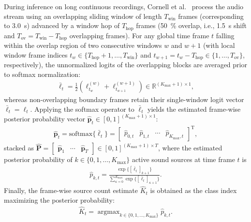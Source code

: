 \documentclass[lettersize,journal]{IEEEtran}
\DeclareMathOperator*{\argmax}{argmax}
\begin{document}
During inference on long continuous recordings, Cornell et al.~\cite{cornell2022overlapped} process the audio stream using an overlapping sliding window of length $T_{\mathrm{win}}$ frames (corresponding to \SI{3.0}{\second}) advanced by a window hop of $T_{\mathrm{hop}}$ frames (\SI{50}{\percent} overlap, i.e., \SI{1.5}{\second} shift and $T_{\mathrm{ov}} = T_{\mathrm{win}} - T_{\mathrm{hop}}$ overlapping frames). For any global time frame $t$ falling within the overlap region of two consecutive windows $w$ and $w+1$ (with local window frame indices $t_w \in \{T_{\mathrm{hop}}+1, \dots, T_{\mathrm{win}}\}$ and $t_{w+1} = t_w - T_{\mathrm{hop}} \in \{1, \dots, T_{\mathrm{ov}}\}$, respectively), the unnormalized logits of the overlapping blocks are averaged prior to softmax normalization:
\begin{align}
  \bar{\bm{\ell}}_t = \frac{1}{2}\left( \bm{\ell}_{t_w}^{(w)} + \bm{\ell}_{t_{w+1}}^{(w+1)} \right) \in \mathbb{R}^{(K_{\mathrm{max}} + 1) \times 1},
  \label{eq:sliding_window_logit_avg}
\end{align}
whereas non-overlapping boundary frames retain their single-window logit vector $\bar{\bm{\ell}}_t = \bm{\ell}_t$. Applying the softmax operator to $\bar{\bm{\ell}}_t$ yields the estimated frame-wise posterior probability vector $\widehat{\mathbf{p}}_t \in [0, 1]^{(K_{\mathrm{max}} + 1) \times 1}$:
\begin{align}
  \widehat{\mathbf{p}}_t = \mathrm{softmax}\{\bar{\bm{\ell}}_t\} = \begin{bmatrix} \widehat{p}_{0,t} & \widehat{p}_{1,t} & \cdots & \widehat{p}_{K_{\mathrm{max}},t} \end{bmatrix}^{\mathrm{T}},
  \label{eq:softmax_posteriors}
\end{align}
stacked as $\widehat{\mathbf{P}} = \begin{bmatrix} \widehat{\mathbf{p}}_1 & \cdots & \widehat{\mathbf{p}}_T \end{bmatrix} \in [0, 1]^{(K_{\mathrm{max}} + 1) \times T}$, where the estimated posterior probability of $k \in \{0, 1, \dots, K_{\mathrm{max}}\}$ active sound sources at time frame $t$ is
\begin{align}
  \widehat{p}_{k,t} = \frac{\exp\{[\bar{\bm{\ell}}_t]_{k+1}\}}{\sum_{\kappa=0}^{K_{\mathrm{max}}} \exp\{[\bar{\bm{\ell}}_t]_{\kappa+1}\}}.
  \label{eq:class_posterior_k}
\end{align}
Finally, the frame-wise source count estimate $\widehat{K}_t$ is obtained as the class index maximizing the posterior probability:
\begin{align}
  \widehat{K}_t = \argmax_{k \in \{0, 1, \dots, K_{\mathrm{max}}\}} \widehat{p}_{k,t}.
  \label{eq:argmax_source_count}
\end{align}
\end{document}
